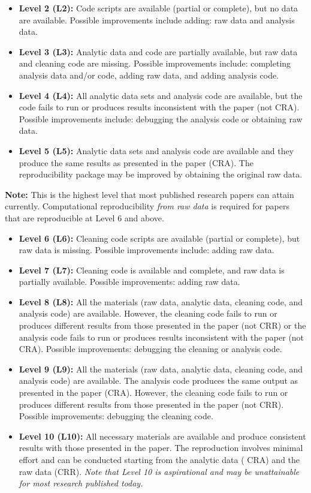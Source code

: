 \documentclass[
  openany]{book}
\begin{document}
\begin{itemize}
\item
  \textbf{Level 2 (L2):} Code scripts are available (partial or complete), but no data are available. Possible improvements include adding: raw data and analysis data.
\item
  \textbf{Level 3 (L3):} Analytic data and code are partially available, but raw data and cleaning code are missing. Possible improvements include: completing analysis data and/or code, adding raw data, and adding analysis code.
\item
  \textbf{Level 4 (L4):} All analytic data sets and analysis code are available, but the code fails to run or produces results inconsistent with the paper (not CRA). Possible improvements include: debugging the analysis code or obtaining raw data.
\item
  \textbf{Level 5 (L5):} Analytic data sets and analysis code are available and they produce the same results as presented in the paper (CRA). The reproducibility package may be improved by obtaining the original raw data.
\end{itemize}

\textbf{Note:} This is the highest level that most published research papers can attain currently. Computational reproducibility \emph{from raw data} is required for papers that are reproducible at Level 6 and above.

\begin{itemize}
\item
  \textbf{Level 6 (L6):} Cleaning code scripts are available (partial or complete), but raw data is missing. Possible improvements include: adding raw data.
\item
  \textbf{Level 7 (L7):} Cleaning code is available and complete, and raw data is partially available. Possible improvements: adding raw data.
\item
  \textbf{Level 8 (L8):} All the materials (raw data, analytic data, cleaning code, and analysis code) are available. However, the cleaning code fails to run or produces different results from those presented in the paper (not CRR) or the analysis code fails to run or produces results inconsistent with the paper (not CRA). Possible improvements: debugging the cleaning or analysis code.
\item
  \textbf{Level 9 (L9):} All the materials (raw data, analytic data, cleaning code, and analysis code) are available. The analysis code produces the same output as presented in the paper (CRA). However, the cleaning code fails to run or produces different results from those presented in the paper (not CRR). Possible improvements: debugging the cleaning code.
\item
  \textbf{Level 10 (L10):} All necessary materials are available and produce consistent results with those presented in the paper. The reproduction involves minimal effort and can be conducted starting from the analytic data ( CRA) and the raw data (CRR). \emph{Note that Level 10 is aspirational and may be unattainable for most research published today.}
\end{itemize}
\end{document}
